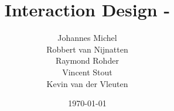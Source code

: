 


\author{Johannes Michel\\Robbert van Nijnatten\\Raymond Rohder\\Vincent Stout\\Kevin van der Vleuten}
\title{Interaction Design - \projectname}
\date{\today}



\maketitle

\renewcommand*\contentsname{Inhoud}
\tableofcontents

%









